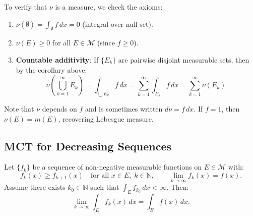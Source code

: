 \documentclass[11pt]{report}
\begin{document}
\begin{rembox}
To verify that $\nu$ is a measure, we check the axioms:
\begin{enumerate}[label=(\roman*)]
\item $\nu(\emptyset) = \int_\emptyset f\,dx = 0$ (integral over null set).
\item $\nu(E) \geq 0$ for all $E \in \mathcal{M}$ (since $f \geq 0$).
\item \textbf{Countable additivity}: If $\{E_k\}$ are pairwise disjoint measurable sets, then by the corollary above:
\[
\nu\!\left(\bigcup_{k=1}^{\infty} E_k\right) = \int_{\bigcup E_k} f\,dx = \sum_{k=1}^{\infty} \int_{E_k} f\,dx = \sum_{k=1}^{\infty} \nu(E_k).
\]
\end{enumerate}
Note that $\nu$ depends on $f$ and is sometimes written $d\nu = f\,dx$. If $f = 1$, then $\nu(E) = m(E)$, recovering Lebesgue measure.
\end{rembox}

\subsection{MCT for Decreasing Sequences}

\begin{thmbox}
Let $\{f_k\}$ be a sequence of non-negative measurable functions on $E \in \mathcal{M}$ with:
\[
f_k(x) \geq f_{k+1}(x) \quad \text{for all } x \in E,\; k \in \mathbb{N}, \qquad \lim_{k \to \infty} f_k(x) = f(x).
\]
Assume there exists $k_0 \in \mathbb{N}$ such that $\int_E f_{k_0}\,dx < \infty$. Then:
\[
\lim_{k \to \infty} \int_E f_k(x)\,dx = \int_E f(x)\,dx.
\]
\end{thmbox}
\end{document}
